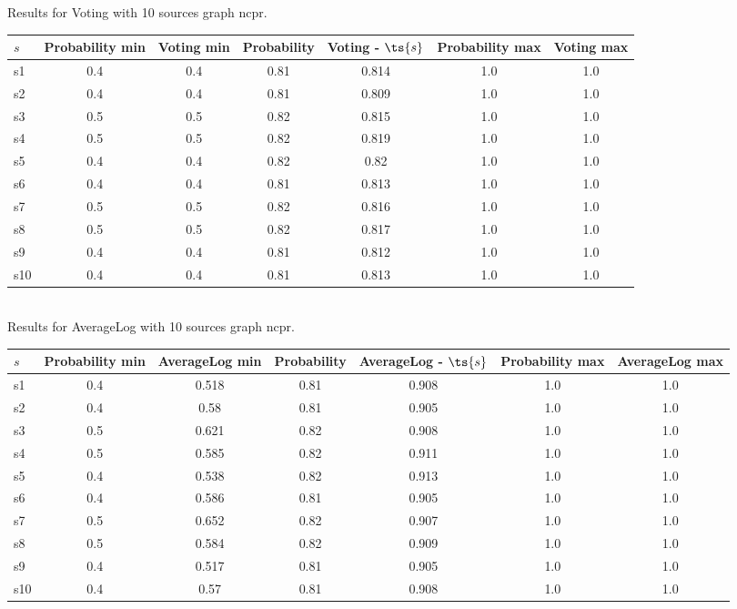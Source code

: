 \documentclass{article}
\begin{document}
\noindent Results for Voting with 10 sources graph ncpr.

\noindent\begin{tabular}{|l|c|c|c|c|c|c|}
\hline
$s$& Probability min & Voting min & Probability & Voting - $\ts{s}$ & Probability max & Voting max\\
\hline
s1 &0.4 & 0.4 & 0.81 & 0.814 & 1.0 & 1.0\\
\hline
s2 &0.4 & 0.4 & 0.81 & 0.809 & 1.0 & 1.0\\
\hline
s3 &0.5 & 0.5 & 0.82 & 0.815 & 1.0 & 1.0\\
\hline
s4 &0.5 & 0.5 & 0.82 & 0.819 & 1.0 & 1.0\\
\hline
s5 &0.4 & 0.4 & 0.82 & 0.82 & 1.0 & 1.0\\
\hline
s6 &0.4 & 0.4 & 0.81 & 0.813 & 1.0 & 1.0\\
\hline
s7 &0.5 & 0.5 & 0.82 & 0.816 & 1.0 & 1.0\\
\hline
s8 &0.5 & 0.5 & 0.82 & 0.817 & 1.0 & 1.0\\
\hline
s9 &0.4 & 0.4 & 0.81 & 0.812 & 1.0 & 1.0\\
\hline
s10 &0.4 & 0.4 & 0.81 & 0.813 & 1.0 & 1.0\\
\hline
\end{tabular}\\

\noindent Results for AverageLog with 10 sources graph ncpr.

\noindent\begin{tabular}{|l|c|c|c|c|c|c|}
\hline
$s$& Probability min & AverageLog min & Probability & AverageLog - $\ts{s}$ & Probability max & AverageLog max\\
\hline
s1 &0.4 & 0.518 & 0.81 & 0.908 & 1.0 & 1.0\\
\hline
s2 &0.4 & 0.58 & 0.81 & 0.905 & 1.0 & 1.0\\
\hline
s3 &0.5 & 0.621 & 0.82 & 0.908 & 1.0 & 1.0\\
\hline
s4 &0.5 & 0.585 & 0.82 & 0.911 & 1.0 & 1.0\\
\hline
s5 &0.4 & 0.538 & 0.82 & 0.913 & 1.0 & 1.0\\
\hline
s6 &0.4 & 0.586 & 0.81 & 0.905 & 1.0 & 1.0\\
\hline
s7 &0.5 & 0.652 & 0.82 & 0.907 & 1.0 & 1.0\\
\hline
s8 &0.5 & 0.584 & 0.82 & 0.909 & 1.0 & 1.0\\
\hline
s9 &0.4 & 0.517 & 0.81 & 0.905 & 1.0 & 1.0\\
\hline
s10 &0.4 & 0.57 & 0.81 & 0.908 & 1.0 & 1.0\\
\hline
\end{tabular}\\
\end{document}
